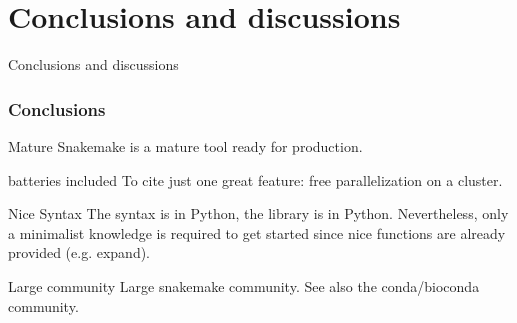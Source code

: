 \documentclass{beamer}
\begin{document}
 
 
\section{Conclusions and discussions}
\begin{frame}[plain]
 \centering
 \begin{Huge}
Conclusions and discussions
\end{Huge}
\end{frame}

 
\begin{frame}
 \frametitle{Conclusions}
 
 \begin{block}{Mature}
  Snakemake is a mature tool ready for production. 
\end{block}

\begin{block}{batteries included}
 To cite just one great feature: free parallelization on a cluster.
\end{block}

\begin{block}{Nice Syntax}
The syntax is in Python, the library is in Python. Nevertheless, 
only a minimalist knowledge is required to get started since 
nice functions are already provided (e.g. expand).
\end{block}

\begin{block}{Large community}
Large snakemake community. See also the conda/bioconda community.
\end{block}

\end{frame}
\end{document}

